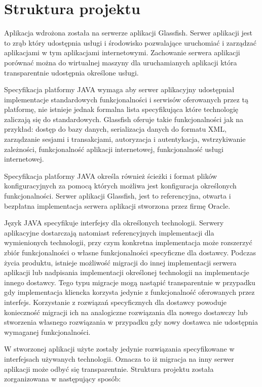 \section{Struktura projektu}
Aplikacja wdrożona została na serwerze aplikacji Glassfish. Serwer aplikacji jest to zrąb który udostępnia usługi i środowisko pozwalające uruchomiać i zarządzać aplikacjami w tym aplikacjami internetowymi. Zachowanie serwera aplikacji porównać można do wirtualnej maszyny dla uruchamianych aplikacji która transparentnie udostępnia określone usługi. 

Specyfikacja platformy JAVA wymaga aby serwer aplikacyjny udostępniał implementacje standardowych funkcjonalności i serwisów oferowanych przez tą platformę, nie istnieje jednak formalna lista specyfikująca które technologię zaliczają się do standardowych. Glassfish oferuje takie funkcjonalności jak na przykład: dostęp do bazy danych, serializacja danych do formatu XML, zarządzanie sesjami i transakcjami, autoryzacja i autentykacja, wstrzykiwanie zależności, funkcjonalność aplikacji internetowej, funkcjonalność usługi internetowej. 

Specyfikacja platformy JAVA określa również ścieżki i format plików konfiguracyjnych za pomocą których możliwa jest konfiguracja określonych funkcjonalności. Serwer aplikacji Glassfish, jest to referencyjna, otwarta i bezpłatna implementacja serwera aplikacji stworzona przez firmę Oracle.

Język JAVA specyfikuje interfejsy dla określonych technologii. Serwery aplikacyjne dostarczają natomiast referencyjnych implementacji dla wymienionych technologii, przy czym konkretna implementacja może rozszerzyć zbiór funkcjonalności o własne funkcjonalności specyficzne dla dostawcy. Podczas życia produktu, istnieje możliwość migracji do innej implementacji serwera aplikacji lub nadpisania implementacji określonej technologii na implementacje innego dostawcy. Tego typu migracje mogą nastąpić transparentnie w przypadku gdy implementacja kliencka korzysta jedynie z funkcjonalność oferowanych przez interfejs. Korzystanie z rozwiązań specyficznych dla dostawcy powoduje konieczność migracji ich na analogiczne rozwiązania dla nowego dostawczy lub stworzenia własnego rozwiązania w przypadku gdy nowy dostawca nie udostępnia wymaganej funkcjonalności.

W stworzonej aplikacji użyte zostały jedynie rozwiązania specyfikowane w interfejsach używanych technologii. Oznacza to iż migracja na inny serwer aplikacji może odbyć się transparentnie.
\clearpage
Struktura projektu została zorganizowana w następujący sposób:


